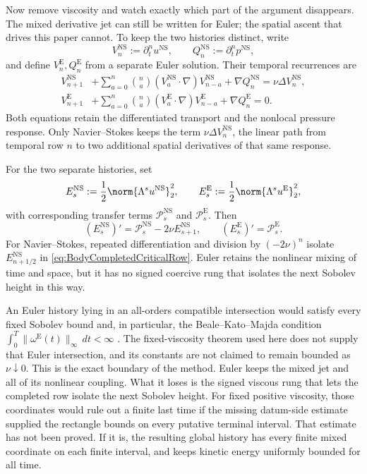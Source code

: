 Now remove viscosity and watch exactly which part of the argument disappears.  The
mixed derivative jet can still be written for Euler; the spatial ascent that drives
this paper cannot.
To keep the two histories distinct, write
\[
  V_n^{\mathrm{NS}}:=\partial_t^nu^{\mathrm{NS}},
  \qquad
  Q_n^{\mathrm{NS}}:=\partial_t^np^{\mathrm{NS}},
\]
and define \(V_n^{\mathrm E},Q_n^{\mathrm E}\) from a separate Euler solution.
Their temporal recurrences are
\begin{align}
  V_{n+1}^{\mathrm{NS}}
  &+
  \sum_{a=0}^{n}\binom{n}{a}
  (V_a^{\mathrm{NS}}\cdot\nabla)V_{n-a}^{\mathrm{NS}}
  +\nabla Q_n^{\mathrm{NS}}
  =\nu\Delta V_n^{\mathrm{NS}},
  \label{eq:NSTemporalRecurrenceComparison}
  \\
  V_{n+1}^{\mathrm E}
  &+
  \sum_{a=0}^{n}\binom{n}{a}
  (V_a^{\mathrm E}\cdot\nabla)V_{n-a}^{\mathrm E}
  +\nabla Q_n^{\mathrm E}
  =0.
  \label{eq:EulerTemporalRecurrenceComparison}
\end{align}
Both equations retain the differentiated transport and the nonlocal pressure response.
Only Navier--Stokes keeps the term \(\nu\Delta V_n^{\mathrm{NS}}\), the linear path
from temporal row \(n\) to two additional spatial derivatives of that same response.

For the two separate histories, set
\[
  E_s^{\mathrm{NS}}:=\frac12\norm{\Lambda^su^{\mathrm{NS}}}_2^2,
  \qquad
  E_s^{\mathrm E}:=\frac12\norm{\Lambda^su^{\mathrm E}}_2^2,
\]
with corresponding transfer terms \(\mathcal P_s^{\mathrm{NS}}\) and \(\mathcal P_s^{\mathrm E}\).
Then
\begin{equation}\label{eq:NSEulerEnergyComparison}
  (E_s^{\mathrm{NS}})'
  =\mathcal P_s^{\mathrm{NS}}-2\nu E_{s+1}^{\mathrm{NS}},
  \qquad
  (E_s^{\mathrm E})'
  =\mathcal P_s^{\mathrm E}.
\end{equation}
For Navier--Stokes, repeated differentiation and division by \((-2\nu)^n\) isolate \(E_{n+1/2}^{\mathrm{NS}}\) in \eqref{eq:BodyCompletedCriticalRow}.
Euler retains the nonlinear mixing of time and space, but it has no signed coercive rung that isolates the next Sobolev height in this way.

An Euler history lying in an all-orders compatible intersection would satisfy every
fixed Sobolev bound and, in particular, the Beale--Kato--Majda condition
\(\int_0^T\|\omega^{\mathrm E}(t)\|_\infty\,dt<\infty\)
\parencite{BealeKatoMajda1984}.
The fixed-viscosity theorem used here does not supply that Euler intersection, and its constants are not claimed to remain bounded as \(\nu\downarrow0\).
This is the exact boundary of the method.  Euler keeps the mixed jet and all of its
nonlinear coupling.  What it loses is the signed viscous rung that lets the completed
row isolate the next Sobolev height.
For fixed positive viscosity, those coordinates would rule out a finite last time if the
missing datum-side estimate supplied the rectangle bounds on every putative terminal
interval.  That estimate has not been proved.  If it is, the resulting global history
has every finite mixed coordinate on each finite interval, and
 keeps kinetic energy uniformly bounded for
all time.
